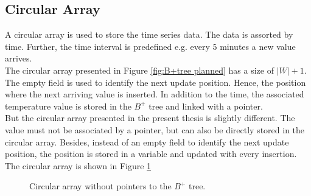\documentclass[abstracton,12pt]{scrreprt}
\begin{document}
\subsection{Circular Array}
A circular array is used to store the time series data. The data is assorted by time. Further, the time interval is predefined e.g. every 5 minutes a new value arrives.\\The circular array presented in Figure \ref{fig:B+tree planned} has a size of $|W| + 1$. The empty field is used to identify the next update position. Hence, the position where the next arriving value is inserted. In addition to the time, the associated temperature value is stored in the $B^+$ tree and linked with a pointer.\\
But the circular array presented in the present thesis is slightly different. The value must not be associated by a pointer, but can also be directly stored in the circular array. Besides, instead of an empty field to identify the next update position, the position is stored in a variable and updated with every insertion. The circular array is shown in Figure \ref{fig:cat}
\begin{figure}[htbp]
	\centering
	\vspace{2mm}
	\caption{Circular array without pointers to the $B^+$ tree.}
	\label{fig:cat}
\end{figure}
\end{document}
